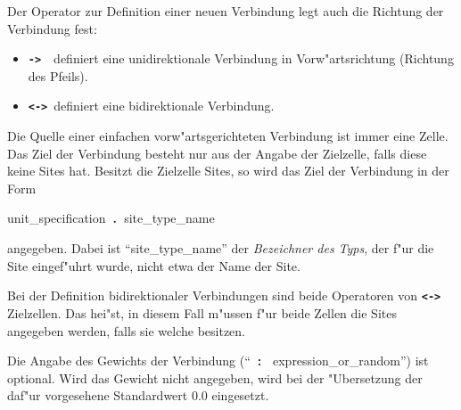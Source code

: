 \begin{center}
\end{center}

Der Operator zur Definition einer neuen Verbindung 
 legt auch die Richtung der Verbindung
 fest:

\begin{itemize}
  \item {\bf \verb&->&}~~definiert eine unidirektionale Verbindung in Vorw"artsrichtung  (Richtung
	des Pfeils).  \item {\bf \verb&<->&}~definiert eine
bidirektionale Verbindung.
\end{itemize}

Die Quelle einer einfachen vorw"artsgerichteten
Verbindung ist immer eine Zelle. Das Ziel
der Verbindung besteht nur aus der Angabe der Zielzelle, falls diese
keine Sites hat. Besitzt die Zielzelle Sites,
so wird das Ziel der Verbindung in der
Form \\ 	 
\centerline{unit\_specification{\bf ~.~}site\_type\_name} angegeben.
Dabei ist ``site\_type\_name'' der {\it Bezeichner 
des Typs\/}, der f"ur die Site eingef"uhrt wurde, nicht etwa der Name
der Site.

Bei der Definition bidirektionaler Verbindungen sind beide Operatoren
von {\bf \verb&<->&} Zielzellen. Das hei"st, in diesem Fall m"ussen
f"ur beide Zellen die Sites angegeben werden, falls sie welche
besitzen.

Die Angabe des Gewichts der Verbindung (``{\bf ~:~}
expression\_or\_random'') ist optional. Wird das Gewicht nicht
angegeben, wird bei der "Ubersetzung der daf"ur vorgesehene
Standardwert 0.0 eingesetzt.



